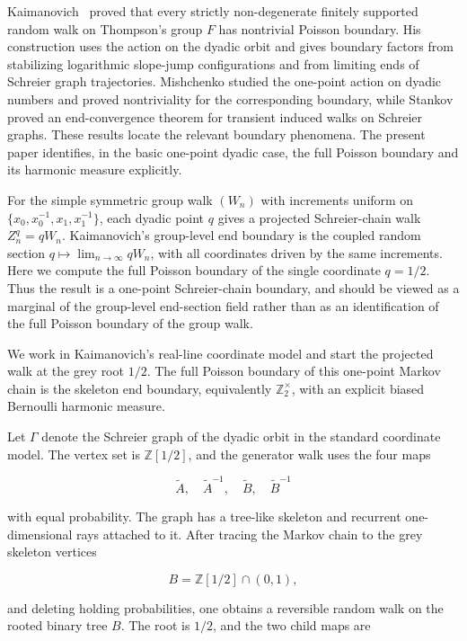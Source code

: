 \documentclass[11pt,a4paper]{scrartcl}
\begin{document}
Kaimanovich~\cite{Kaimanovich2017} proved that every strictly non-degenerate
finitely supported random walk on Thompson's group \(F\) has nontrivial Poisson
boundary.  His construction uses the action on the dyadic orbit and gives
boundary factors from stabilizing logarithmic slope-jump configurations and
from limiting ends of Schreier graph trajectories.  Mishchenko
\cite{Mishchenko2015} studied the one-point action on dyadic numbers and proved
nontriviality for the corresponding boundary, while Stankov
\cite{Stankov2022Convergence} proved an end-convergence theorem for transient
induced walks on Schreier graphs.  These results locate the relevant boundary
phenomena.  The present paper identifies, in the basic one-point dyadic case,
the full Poisson boundary and its harmonic measure explicitly.

For the simple symmetric group walk \((W_n)\) with increments uniform on
\(\{x_0,x_0^{-1},x_1,x_1^{-1}\}\), each dyadic point \(q\) gives a projected
Schreier-chain walk \(Z_n^q=qW_n\).  Kaimanovich's group-level end boundary is
the coupled random section \(q\mapsto \lim_{n\to\infty} qW_n\), with all
coordinates driven by the same increments.  Here we compute the full Poisson
boundary of the single coordinate \(q=1/2\).  Thus the result is a one-point
Schreier-chain boundary, and should be viewed as a marginal of the
group-level end-section field rather than as an identification of the full
Poisson boundary of the group walk.

We work in Kaimanovich's real-line coordinate model and start the projected
walk at the grey root \(1/2\). The full Poisson boundary of this one-point
Markov chain is the skeleton end boundary, equivalently
\(\mathbb Z_2^\times\), with an explicit biased Bernoulli harmonic measure.

Let \(\Gamma\) denote the Schreier graph of the dyadic orbit in the standard
coordinate model. The vertex set is \(\mathbb Z[1/2]\), and the generator walk
uses the four maps

\[
\widetilde A,\quad \widetilde A^{-1},\quad
\widetilde B,\quad \widetilde B^{-1}
\]

with equal probability. The graph has a tree-like skeleton and recurrent
one-dimensional rays attached to it. After tracing the Markov chain to the
grey skeleton vertices

\[
B=\mathbb Z[1/2]\cap(0,1),
\]

and deleting holding probabilities, one obtains a reversible random walk on
the rooted binary tree \(B\). The root is \(1/2\), and the two child maps are
\end{document}
